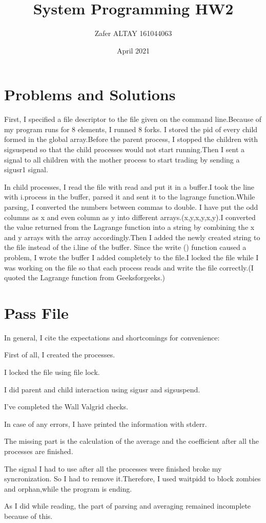 \documentclass{article}
\title{System Programming HW2}
\author{Zafer ALTAY 161044063 }
\date{April 2021}
\begin{document}
\maketitle

\section{Problems and Solutions}
First, I specified a file descriptor to the file given on the command line.Because of my program runs for 8 elements, I runned 8 forks.
I stored the pid of every child formed in the global array.Before the parent process, I stopped the children with sigsuspend so that the child processes would not start running.Then I sent a signal to all children with the mother process to start trading by sending a sigusr1 signal.

In child processes, I read the file with read and put it in a buffer.I took the line with i.process in the buffer, parsed it and sent it to the lagrange function.While parsing, I converted the numbers between commas to double. I have put the odd columns as x and even column as y into different arrays.(x,y,x,y,x,y).I converted the value returned from the Lagrange function into a string by combining the x and y arrays with the array accordingly.Then I added the newly created string to the file instead of the i.line of the buffer. Since the write () function caused a problem, I wrote the buffer I added completely to the file.I locked the file while I was working on the file so that each process reads and write the file correctly.(I quoted the Lagrange function from Geeksforgeeks.)


\section{Pass File}

In general, I cite the expectations and shortcomings for convenience:

First of all, I created the processes.

I locked the file using file lock.

I did parent and child interaction using sigusr and sigsuspend.


I've completed the Wall Valgrid checks.


In case of any errors, I have printed the information with stderr.


The missing part is the calculation of the average and the coefficient after all the processes are finished.

The signal I had to use after all the processes were finished broke my syncronization. So I had to remove it.Therefore, I used waitpidd to block zombies and orphan,while the program is ending. 


As I did while reading, the part of parsing and averaging remained incomplete because of this.
\end{document}
